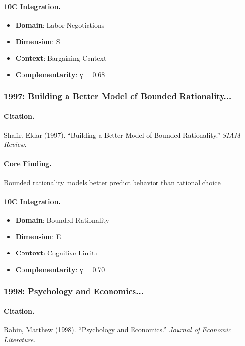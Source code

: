 \paragraph{10C Integration.}
\begin{itemize}[nosep]
  \item \textbf{Domain}: Labor Negotiations
  \item \textbf{Dimension}: S
  \item \textbf{Context}: Bargaining Context
  \item \textbf{Complementarity}: γ = 0.68
\end{itemize}

\subsubsection{1997: Building a Better Model of Bounded Rationality...}

\paragraph{Citation.}
Shafir, Eldar (1997). ``Building a Better Model of Bounded Rationality.''
\textit{SIAM Review}.

\paragraph{Core Finding.}
Bounded rationality models better predict behavior than rational choice

\paragraph{10C Integration.}
\begin{itemize}[nosep]
  \item \textbf{Domain}: Bounded Rationality
  \item \textbf{Dimension}: E
  \item \textbf{Context}: Cognitive Limits
  \item \textbf{Complementarity}: γ = 0.70
\end{itemize}

\subsubsection{1998: Psychology and Economics...}

\paragraph{Citation.}
Rabin, Matthew (1998). ``Psychology and Economics.''
\textit{Journal of Economic Literature}.

